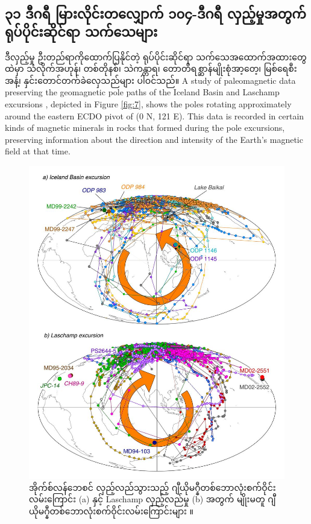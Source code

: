 \documentclass[10pt,twocolumn,letterpaper]{article}
\begin{document}
\subsection{၃၁ ဒီဂရီ မြားလိုင်းတလျှောက် ၁၀၄-ဒီဂရီ လှည့်မှုအတွက် ရုပ်ပိုင်းဆိုင်ရာ သက်သေများ}

ဒီလှည့်မှု ဦးတည်ရာကိုထောက်ပြနိုင်တဲ့ ရုပ်ပိုင်းဆိုင်ရာ သက်သေအထောက်အထားတွေထဲမှာ သံလိုက်အဟုန်၊ တစ်တိုနစ်၊ သဲကန္တာရ၊ တောတိရစ္ဆာန်မျိုးစုံအာ့တေ့၊ မြစ်ရေစီးအနံ့၊ နှင်းတောင်တက်ခဲလှေသည်များ ပါဝင်သည်။
A study of paleomagnetic data preserving the geomagnetic pole paths of the Iceland Basin and Laschamp excursions \cite{35}, depicted in Figure \ref{fig:7}, shows the poles rotating approximately around the eastern ECDO pivot of (0 N, 121 E). This data is recorded in certain kinds of magnetic minerals in rocks that formed during the pole excursions, preserving information about the direction and intensity of the Earth's magnetic field at that time.

\begin{figure}[t]
\begin{center}
   \includegraphics[width=0.95\linewidth]{laj.jpg}
\end{center}
   \caption{အိုက်စ်လန်ဘေစင် လှည့်လည်သွားသည့် ဂျီယိုမဂ္နီတစ်ဘောလုံးစက်ဝိုင်းလမ်းကြောင်း (a) နှင့် Laschamp လှည့်လည်မှု (b) အတွက် မျိုးမတူ ဂျီယိုမဂ္နီတစ်ဘောလုံးစက်ဝိုင်းလမ်းကြောင်းများ \cite{35}။}
\label{fig:7}
\label{fig:onecol}
\end{figure}
\end{document}
